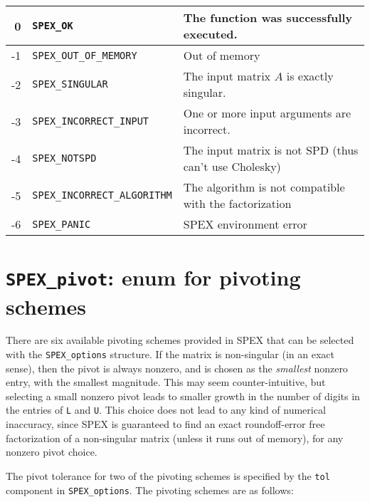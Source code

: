 \documentclass[12pt,oneside]{book}
\theoremstyle{definition}
\newenvironment{SizedCenteredTabular}[2][\small]
    {   
        #1\begin{center}\begin{tabular}{#2}
    }{ 
        \end{tabular}\end{center}
    }
\begin{document}
\begin{SizedCenteredTabular}{rll} \hline
     0 & \verb|SPEX_OK|& The function was successfully executed.\\ \hline
    -1 & \verb|SPEX_OUT_OF_MEMORY|& Out of memory\\ \hline
    -2 & \verb|SPEX_SINGULAR|& The input matrix $A$ is exactly singular.\\ \hline
    -3 & \verb|SPEX_INCORRECT_INPUT|& One or more input arguments are incorrect.\\ \hline
    -4 & \verb|SPEX_NOTSPD| & The input matrix is not SPD (thus can't use Cholesky) \\ \hline
    -5 & \verb|SPEX_INCORRECT_ALGORITHM| & The algorithm is not compatible with the factorization \\ \hline
    -6 & \verb|SPEX_PANIC| & SPEX environment error \\ \hline
\end{SizedCenteredTabular}


\section{\texttt{SPEX\_pivot}: enum for pivoting schemes}\label{ss:SPEX_pivot}
There are six available pivoting schemes provided in SPEX that can be
selected with the \verb|SPEX_options| structure.  If the matrix is non-singular
(in an exact sense), then the pivot is always nonzero, and is chosen as the
{\em smallest} nonzero entry, with the smallest magnitude.  This may seem
counter-intuitive, but selecting a small nonzero pivot leads to smaller growth
in the number of digits in the entries of \verb|L| and \verb|U|.  This choice
does not lead to any kind of numerical inaccuracy, since SPEX is guaranteed
to find an exact roundoff-error free factorization of a non-singular matrix
(unless it runs out of memory), for any nonzero pivot choice.

The pivot tolerance for two of the pivoting schemes is specified by the
\verb|tol| component in \verb|SPEX_options|.  The pivoting schemes are as
follows:
\end{document}
